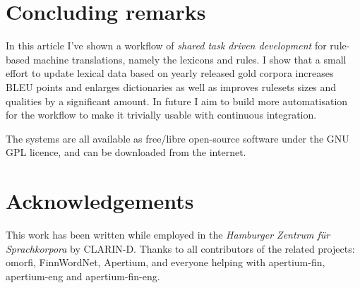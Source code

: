 \documentclass[11pt,a4paper]{article}
\begin{document}
\section{Concluding remarks}
\label{sec:conclusions}

In this article I've shown a workflow of \textit{shared task driven
development} for rule-based machine translations, namely the lexicons and rules.
I show that a small effort to update lexical data based on yearly released gold
corpora increases BLEU points and enlarges dictionaries as well as improves
rulesets sizes and qualities by a significant amount. In future I aim to build
more automatisation for the workflow to make it trivially usable with continuous
integration.

The systems are all available as free/libre open-source software under the GNU
GPL licence, and can be downloaded from the internet.

\section*{Acknowledgements}
\label{sec:acknowlegdements}

\ifaclfinal%
This work has been written while employed in the \textit{Hamburger Zentrum f\"ur
Sprachkorpora} by CLARIN-D. Thanks to all contributors of the related projects:
omorfi, FinnWordNet, Apertium, and everyone helping with
apertium-fin, apertium-eng and apertium-fin-eng.
\fi



\end{document}
